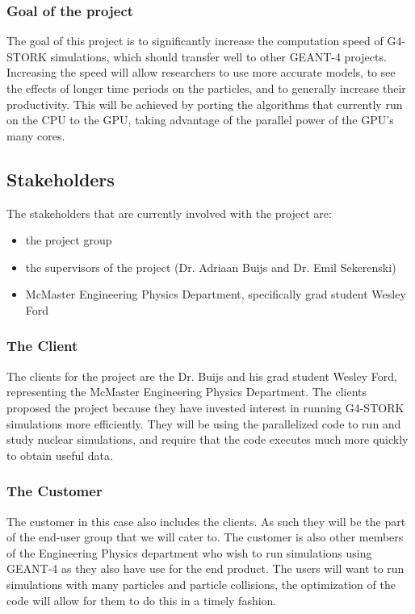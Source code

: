 \documentclass[12pt]{article}
\begin{document}
\subsubsection{Goal of the project}
The goal of this project is to significantly increase the computation speed of G4-STORK simulations, which should transfer well to other GEANT-4 projects. Increasing the speed will allow researchers to use more accurate models, to see the effects of longer time periods on the particles, and to generally increase their productivity. This will be achieved by porting the algorithms that currently run on the CPU to the GPU, taking advantage of the parallel power of the GPU's many cores.

\subsection{Stakeholders}\label{SubSec_Stakeholders} %
The stakeholders that are currently involved with the project are:
\begin{itemize}
\item the project group
\item the supervisors of the project (Dr. Adriaan Buijs and Dr. Emil Sekerenski)
\item McMaster Engineering Physics Department, specifically grad student Wesley Ford
\end{itemize}

\subsubsection{The Client}
The clients for the project are the Dr. Buijs and his grad student Wesley Ford, representing the McMaster Engineering Physics Department. The clients proposed the project because they have invested interest in running G4-STORK simulations more efficiently. They will be using the parallelized code to run and study nuclear simulations, and require that the code executes much more quickly to obtain useful data.
	
\subsubsection{The Customer}
The customer in this case also includes the clients. As such they will be the part of the end-user group that we will cater to.
The customer is also other members of the Engineering Physics department who wish to run simulations using GEANT-4 as they also have use for the end product. The users will want to run simulations with many particles and particle collisions, the optimization of the code will allow for them to do this in a timely fashion.
	
\end{document}
